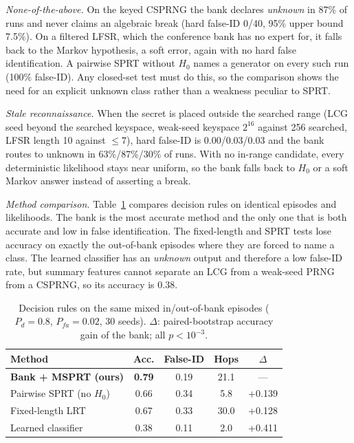 \emph{None-of-the-above.} On the keyed CSPRNG the bank declares
\emph{unknown} in 87\% of runs and never claims an algebraic break
(hard false-ID 0/40, 95\% upper bound 7.5\%). On a filtered LFSR, which the
conference bank has no expert for, it falls back to the Markov hypothesis, a
soft error, again with no hard false identification. A pairwise SPRT without
$H_0$ names a generator on every such run (100\% false-ID). Any closed-set test
must do this, so the comparison shows the need for an explicit unknown class
rather than a weakness peculiar to SPRT.

\emph{Stale reconnaissance.} When the secret is placed outside the searched
range (LCG seed beyond the searched keyspace, weak-seed keyspace $2^{16}$
against 256 searched, LFSR length 10 against $\le7$), hard false-ID is
0.00/0.03/0.03 and the bank routes to unknown in 63\%/87\%/30\% of runs. With no
in-range candidate, every deterministic likelihood stays near uniform, so the
bank falls back to $H_0$ or a soft Markov answer instead of asserting a break.

\emph{Method comparison.} Table~\ref{tab:methods} compares decision rules on
identical episodes and likelihoods. The bank is the most accurate method and
the only one that is both accurate and low in false identification. The
fixed-length and SPRT tests lose accuracy on exactly the out-of-bank episodes
where they are forced to name a class. The learned classifier has an
\emph{unknown} output and therefore a low false-ID rate, but summary features
cannot separate an LCG from a weak-seed PRNG from a CSPRNG, so its accuracy is
0.38.

\begin{table}[t]
\centering
\caption{Decision rules on the same mixed in/out-of-bank episodes
($P_d=0.8$, $P_{fa}=0.02$, 30 seeds). $\Delta$: paired-bootstrap accuracy gain
of the bank; all $p<10^{-3}$.}
\label{tab:methods}
\begin{tabular}{lcccc}
\toprule
Method & Acc. & False-ID & Hops & $\Delta$ \\
\midrule
\textbf{Bank + MSPRT (ours)} & \textbf{0.79} & 0.19 & 21.1 & --- \\
Pairwise SPRT (no $H_0$)     & 0.66 & 0.34 & 5.8  & +0.139 \\
Fixed-length LRT             & 0.67 & 0.33 & 30.0 & +0.128 \\
Learned classifier           & 0.38 & 0.11 & 2.0  & +0.411 \\
\bottomrule
\end{tabular}
\end{table}


